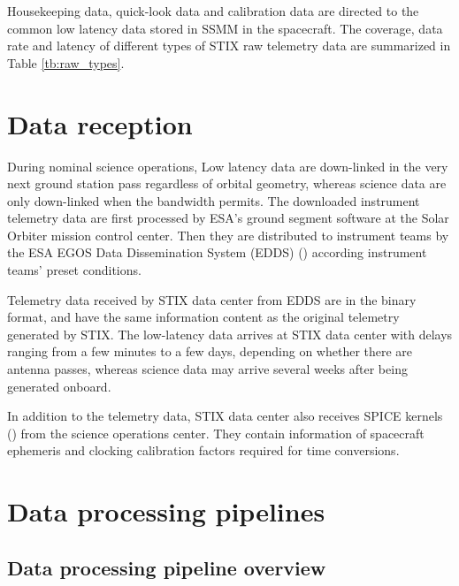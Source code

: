 \documentclass{aa}
\begin{document}
Housekeeping data, quick-look data and calibration data are directed to the
common low latency data stored in SSMM in the spacecraft.
The coverage, data rate and latency of 
different types of STIX raw telemetry data are
summarized in Table \ref{tb:raw_types}.


\section{Data reception}

During nominal science operations,
Low latency data are down-linked in the very next ground station pass regardless of orbital geometry, 
whereas science data are only down-linked when the bandwidth permits.
The downloaded instrument telemetry data are first processed by ESA's ground segment
software at the Solar Orbiter mission control center. Then they
are distributed to instrument teams by the ESA EGOS Data
Dissemination System (EDDS) (\cite{EDDS}) according instrument teams' preset conditions.

Telemetry data received by STIX data center from EDDS  are in the binary format, and have the same
 information content as the original telemetry generated by STIX.
The low-latency data arrives at STIX data center with delays ranging from a few minutes to a few days, depending on whether there
are antenna passes, whereas science data may arrive several weeks after being generated onboard.

In addition to the telemetry data, STIX data center also receives SPICE kernels (\cite{spice1996,spice2018})  from the science operations center.
They contain information of spacecraft ephemeris and clocking calibration factors required for time conversions.


\section{Data processing pipelines}
\subsection{Data processing pipeline overview}
\end{document}
